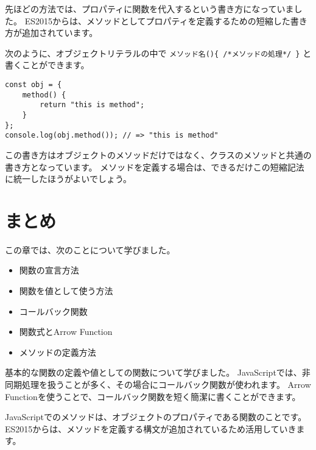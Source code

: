 先ほどの方法では、プロパティに関数を代入するという書き方になっていました。
ES2015からは、メソッドとしてプロパティを定義するための短縮した書き方が追加されています。

次のように、オブジェクトリテラルの中で
\texttt{メソッド名()\{ /*メソッドの処理*/ \}}
と書くことができます。

\begin{lstlisting}
const obj = {
    method() {
        return "this is method";
    }
};
console.log(obj.method()); // => "this is method"
\end{lstlisting}

この書き方はオブジェクトのメソッドだけではなく、クラスのメソッドと共通の書き方となっています。
メソッドを定義する場合は、できるだけこの短縮記法に統一したほうがよいでしょう。

\hypertarget{function-declaration-summary}{%
\section{まとめ}\label{function-declaration-summary}}

この章では、次のことについて学びました。

\begin{itemize}
\item
  関数の宣言方法
\item
  関数を値として使う方法
\item
  コールバック関数
\item
  関数式とArrow Function
\item
  メソッドの定義方法
\end{itemize}

基本的な関数の定義や値としての関数について学びました。
JavaScriptでは、非同期処理を扱うことが多く、その場合にコールバック関数が使われます。
Arrow
Functionを使うことで、コールバック関数を短く簡潔に書くことができます。

JavaScriptでのメソッドは、オブジェクトのプロパティである関数のことです。
ES2015からは、メソッドを定義する構文が追加されているため活用していきます。
